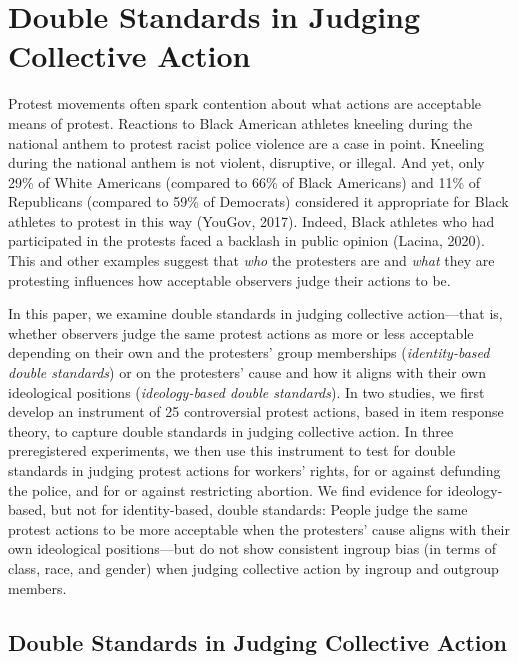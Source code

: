 \documentclass[12pt, letterpaper]{article}
\begin{document}
\newpage

\section{ Double Standards in Judging Collective Action }

Protest movements often spark contention about what actions are
acceptable means of protest. Reactions to Black American athletes
kneeling during the national anthem to protest racist police violence
are a case in point. Kneeling during the national anthem is not violent,
disruptive, or illegal. And yet, only 29\% of White Americans (compared
to 66\% of Black Americans) and 11\% of Republicans (compared to 59\% of
Democrats) considered it appropriate for Black athletes to protest in
this way (YouGov, 2017). Indeed, Black athletes who had participated in
the protests faced a backlash in public opinion (Lacina, 2020). This and
other examples suggest that \emph{who} the protesters are and
\emph{what} they are protesting influences how acceptable observers
judge their actions to be.

In this paper, we examine double standards in judging collective
action---that is, whether observers judge the same protest actions as
more or less acceptable depending on their own and the protesters' group
memberships (\emph{identity-based double standards}) or on the
protesters' cause and how it aligns with their own ideological positions
(\emph{ideology-based double standards}). In two studies, we first
develop an instrument of 25 controversial protest actions, based in item
response theory, to capture double standards in judging collective
action. In three preregistered experiments, we then use this instrument
to test for double standards in judging protest actions for workers'
rights, for or against defunding the police, and for or against
restricting abortion. We find evidence for ideology-based, but not for
identity-based, double standards: People judge the same protest actions
to be more acceptable when the protesters' cause aligns with their own
ideological positions---but do not show consistent ingroup bias (in
terms of class, race, and gender) when judging collective action by
ingroup and outgroup members.

\hypertarget{double-standards-in-judging-collective-action}{%
\subsection{Double Standards in Judging Collective
Action}\label{double-standards-in-judging-collective-action}}
\end{document}
